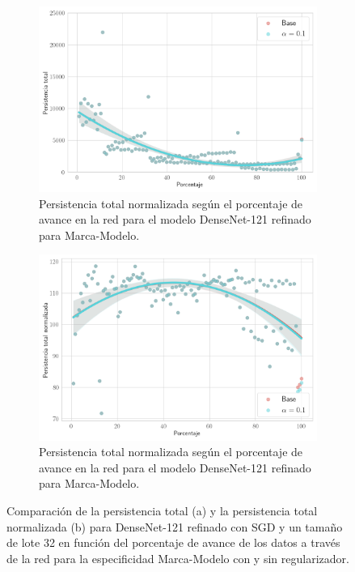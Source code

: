 \begin{figure}[H]
	\centering
	\begin{subfigure}
		{.5\textwidth}
		\centering
		\includegraphics[width=\linewidth]{img/exp_refine_densenet.png}
		\caption{Persistencia total normalizada según el porcentaje de avance en la
			red para el modelo DenseNet-121 refinado para Marca-Modelo.}
		\label{fig:densenet-norm-1}
	\end{subfigure}%
	\begin{subfigure}
		{.5\textwidth}
		\centering
		\includegraphics[width=\linewidth]{img/exp_refine_densenet_norm.png}
		\caption{Persistencia total normalizada según el porcentaje de avance en la
			red para el modelo DenseNet-121 refinado para Marca-Modelo.}
		\label{fig:densenet-norm-2}
	\end{subfigure}
	\caption{Comparación de la persistencia total (a) y la persistencia total
		normalizada (b) para DenseNet-121 refinado con SGD y un tamaño de lote 32 en
		función del porcentaje de avance de los datos a través de la red para la
		especificidad Marca-Modelo con y sin regularizador.}
	\label{fig:densenet-norm}
\end{figure}

